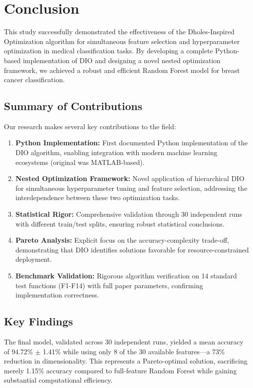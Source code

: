 \documentclass[12pt, a4paper]{article}
\begin{document}
\section{Conclusion}

This study successfully demonstrated the effectiveness of the Dholes-Inspired Optimization algorithm for simultaneous feature selection and hyperparameter optimization in medical classification tasks. By developing a complete Python-based implementation of DIO and designing a novel nested optimization framework, we achieved a robust and efficient Random Forest model for breast cancer classification.

\subsection{Summary of Contributions}
Our research makes several key contributions to the field:
\begin{enumerate}
    \item \textbf{Python Implementation:} First documented Python implementation of the DIO algorithm, enabling integration with modern machine learning ecosystems (original was MATLAB-based).
    \item \textbf{Nested Optimization Framework:} Novel application of hierarchical DIO for simultaneous hyperparameter tuning and feature selection, addressing the interdependence between these two optimization tasks.
    \item \textbf{Statistical Rigor:} Comprehensive validation through 30 independent runs with different train/test splits, ensuring robust statistical conclusions.
    \item \textbf{Pareto Analysis:} Explicit focus on the accuracy-complexity trade-off, demonstrating that DIO identifies solutions favorable for resource-constrained deployment.
    \item \textbf{Benchmark Validation:} Rigorous algorithm verification on 14 standard test functions (F1-F14) with full paper parameters, confirming implementation correctness.
\end{enumerate}

\subsection{Key Findings}
The final model, validated across 30 independent runs, yielded a mean accuracy of 94.72\% $\pm$ 1.41\% while using only 8 of the 30 available features—a 73\% reduction in dimensionality. This represents a Pareto-optimal solution, sacrificing merely 1.15\% accuracy compared to full-feature Random Forest while gaining substantial computational efficiency. 
\end{document}
